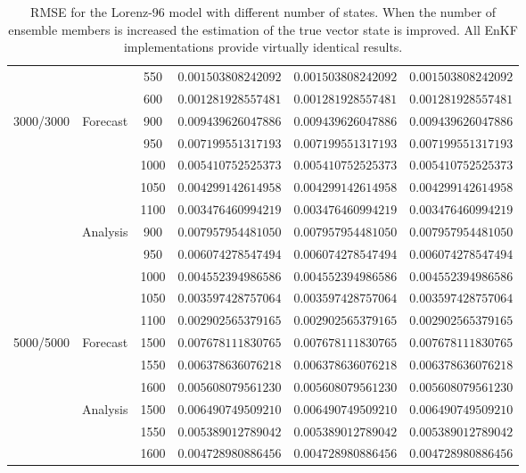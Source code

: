 \documentclass[12pt]{article}
\begin{document}
\begin{table}[H]
{\begin{tabular}{|c|c|c|c|c|c|}
& & 550 & $0.001503808242092$ & $0.001503808242092$ & $0.001503808242092$  \\ 
& & 600 & $0.001281928557481$ & $0.001281928557481$ & $0.001281928557481$ \\ \hline
\multirow{10}{*}{3000/3000} & \multirow{5}{*}{Forecast}  & 900 & $0.009439626047886$ & $0.009439626047886$ & $0.009439626047886$  \\ 
&  & 950 & $0.007199551317193$ & $0.007199551317193$ & $0.007199551317193$ \\ 
&  & 1000 & $0.005410752525373$ & $0.005410752525373$ & $0.005410752525373$  \\ 
&  & 1050 & $0.004299142614958$ & $0.004299142614958$ & $0.004299142614958$  \\ 
&  & 1100 & $0.003476460994219$ & $0.003476460994219$ & $0.003476460994219$ \\ \cline{2-6}
& \multirow{5}{*}{Analysis} &  900 & $0.007957954481050$ & $0.007957954481050$ & $0.007957954481050$  \\ 
& & 950 & $0.006074278547494$ & $0.006074278547494$ & $0.006074278547494$ \\ 
& & 1000 & $0.004552394986586$ & $0.004552394986586$ & $0.004552394986586$  \\ 
& & 1050 & $0.003597428757064$ & $0.003597428757064$ & $0.003597428757064$  \\ 
& & 1100 & $0.002902565379165$ & $0.002902565379165$ & $0.002902565379165$ \\ \hline
\multirow{6}{*}{5000/5000} & \multirow{3}{*}{Forecast}  & 1500 & $0.007678111830765$ & $0.007678111830765$ & $0.007678111830765$  \\ 
&  & 1550 & $0.006378636076218$ & $0.006378636076218$ & $0.006378636076218$ \\ 
&  & 1600 & $0.005608079561230$ & $0.005608079561230$ & $0.005608079561230$ \\ \cline{2-6}
& \multirow{3}{*}{Analysis} &  1500 & $0.006490749509210$ & $0.006490749509210$ & $0.006490749509210$  \\ 
& & 1550 & $0.005389012789042$ & $0.005389012789042$ & $0.005389012789042$ \\ 
& & 1600 & $ 0.004728980886456$ & $ 0.004728980886456$ & $0.004728980886456$ \\ \hline
\end{tabular}
}
\caption{RMSE for the Lorenz-96 model with different number of states. When the number of ensemble members is increased the estimation of the true vector state is improved. All EnKF implementations provide virtually identical results.}
\label{Tab:Lorenz-Results-RMS}
\end{table}
\end{document}
